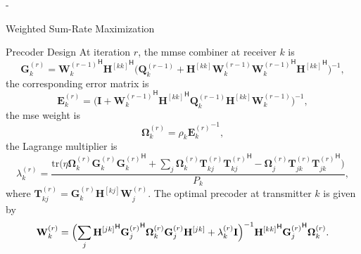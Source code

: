 \begin{section}{-}
\begin{subsection}{Weighted Sum-Rate Maximization}
\begin{subsubsection}{Precoder Design}
			At iteration $r$, the \gls{mmse} combiner at receiver $k$ is
			\begin{equation}
				\mathbf{G}_k^{(r)} = {\mathbf{W}_k^{(r-1)}}^\mathsf{H} {\mathbf{H}^{[kk]}}^\mathsf{H} \bigl(\mathbf{Q}_k^{(r-1)} + {\mathbf{H}^{[kk]}} \mathbf{W}_k^{(r-1)} {\mathbf{W}_k^{(r-1)}}^\mathsf{H} {\mathbf{H}^{[kk]}}^\mathsf{H}\bigr)^{-1},
			\end{equation}
			the corresponding error matrix is
			\begin{equation}
				\mathbf{E}_k^{(r)} = \bigl(\mathbf{I} + {\mathbf{W}_k^{(r-1)}}^\mathsf{H} {\mathbf{H}^{[kk]}}^\mathsf{H} \mathbf{Q}_k^{(r-1)} {\mathbf{H}^{[kk]}} \mathbf{W}_k^{(r-1)}\bigr)^{-1},
			\end{equation}
			the \gls{mse} weight is
			\begin{equation}
				\mathbf{\Omega}_k^{(r)} = \rho_k {\mathbf{E}_k^{(r)}}^{-1},
			\end{equation}
			the Lagrange multiplier is
			\begin{equation}
				\lambda_k^{(r)} = \frac{\mathrm{tr}\bigl(\eta \mathbf{\Omega}_k^{(r)} \mathbf{G}_k^{(r)}{\mathbf{G}_k^{(r)}}^\mathsf{H} + \sum_j \mathbf{\Omega}_k^{(r)}\mathbf{T}_{kj}^{(r)} {\mathbf{T}_{kj}^{(r)}}^\mathsf{H} - \mathbf{\Omega}_j^{(r)}\mathbf{T}_{jk}^{(r)} {\mathbf{T}_{jk}^{(r)}}^\mathsf{H} \bigr)}{P_k},
			\end{equation}
			where $\mathbf{T}_{kj}^{(r)} = \mathbf{G}_k^{(r)} {\mathbf{H}^{[kj]}} \mathbf{W}_j^{(r)}$.
			The optimal precoder at transmitter $k$ is given by
			\begin{equation}
				\mathbf{W}_k^{(r)} = \Bigl(\sum_j {\mathbf{H}^{[jk]}}^\mathsf{H} {\mathbf{G}_j^{(r)}}^\mathsf{H} \mathbf{\Omega}_k^{(r)} \mathbf{G}_j^{(r)} \mathbf{H}^{[jk]} + \lambda_k^{(r)} \mathbf{I} \Bigr)^{-1} {\mathbf{H}^{[kk]}}^\mathsf{H} {\mathbf{G}_j^{(r)}}^\mathsf{H} \mathbf{\Omega}_k^{(r)}.
			\end{equation}
		\end{subsubsection}


\end{subsection}
\end{section}
